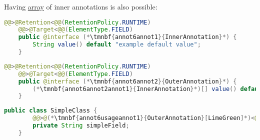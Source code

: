 \emten
\noindent Having \hyperref[javaarray]{array} of inner annotations is also possible:
\begin{lstlisting}[language=Java, title={Inner annotation}]
    @@>@Retention<@@(RetentionPolicy.RUNTIME)
    @@>@Target<@@(ElementType.FIELD)
    public @interface (*\tmnbf{annot6annot1}{InnerAnnotation}*) {
        String value() default "example default value";
    }
\end{lstlisting}
\begin{lstlisting}[language=Java, title={Outer annotation}]
    @@>@Retention<@@(RetentionPolicy.RUNTIME)
    @@>@Target<@@(ElementType.FIELD)
    public @interface (*\tmnbf{annot6annot2}{OuterAnnotation}*) {
        (*\tmnbf{annot6annot2annot1}{InnerAnnotation}*)[] value() default {@@>@(*\tmnbf{annot6annot2annot2}{InnerAnnotation}[LimeGreen]*)<@@("overridden default value")};
    }
\end{lstlisting}
\begin{lstlisting}[language=Java, title={Usage}]
    public class SimpleClass {
        @@>@(*\tmnbf{annot6usageannot1}{OuterAnnotation}[LimeGreen]*)<@@({@@>@(*\tmnbf{annot6usageannot2}{InnerAnnotation}[LimeGreen]*)<@@("new value"), @@>@(*\tmnbf{annot6usageannot3}{InnerAnnotation}[LimeGreen]*)<@@("another value")})
        private String simpleField;
    }
\end{lstlisting}
\newpage

